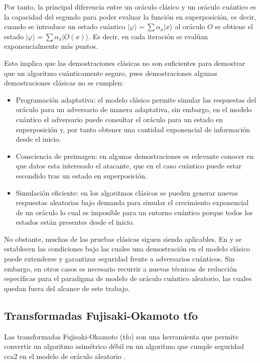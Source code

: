 Por tanto, la principal diferencia entre un oráculo clásico y un oráculo cuántico es la capacidad del segundo para poder evaluar la función en superposición, es decir, cuando se introduce un estado cuántico \(\lvert \varphi \rangle = \sum \alpha_x \lvert x \rangle\) al oráculo \(O\) se obtiene el estado \(\lvert \varphi \rangle = \sum \alpha_x \lvert O(x) \rangle\). Es decir, en cada iteración se evalúan exponencialmente más puntos.
\newline

Esto implica que las demostraciones clásicas no son suficientes para demostrar que un algoritmo cuánticamente seguro, pues demostraciones algunas demostraciones clásicas no se cumplen:
\begin{itemize}
	\item Programación adaptativa: el modelo clásico permite simular las respuestas del oráculo para un adversario de manera adaptativa, sin embargo, en el modelo cuántico el adversario puede consultar el oráculo para un estado en superposición y, por tanto obtener una cantidad exponencial de información desde el inicio.
	\item Consciencia de preimagen: en algunas demostraciones es relevante conocer en que datos esta interesado el atacante, que en el caso cuántico puede estar escondido tras un estado en superposición.
	\item Simulación eficiente: en los algoritmos clásicos se pueden generar nuevas respuestas aleatorias bajo demanda para simular el crecimiento exponencial de un oráculo lo cual es imposible para un entorno cuántico porque todos los estados están presentes desde el inicio.  
\end{itemize}

No obstante, muchas de las pruebas clásicas siguen siendo aplicables. En \cite{QROM} y \cite{yamakawa2021classical} se establecen las condiciones bajo las cuales una demostración en el modelo clásico puede extenderse y garantizar seguridad frente a adversarios cuánticos. Sin embargo, en otros casos es necesario recurrir a nuevas técnicas de reducción específicas para el paradigma de modelo de oráculo cuántico aleatorio, las cuales quedan fuera del alcance de este trabajo.

\subsection{Transformadas Fujisaki-Okamoto \acrshort{tfo}}
Las transformadas Fujisaki-Okamoto (\acrshort{tfo}) son una herramienta que permite convertir un algoritmo asimétrico débil en un algoritmo que cumple seguridad \acrshort{cca2} en el modelo de oráculo aleatorio \cite{Fujisaki1999}.
\newline

